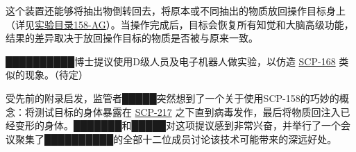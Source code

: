 这个装置还能够将抽出物倒转回去，将原本或不同抽出的物质放回操作目标身上（详见\hyperref[sec:DOC-experiment-log-158-ag]{实验目录158-AG}）。当操作完成后，目标会恢复所有知觉和大脑高级功能，结果的差异取决于放回操作目标的物质是否被与原来一致。

██████████博士提议使用D级人员及电子机器人做实验，以仿造 \hyperref[chap:SCP-168]{SCP-168} 类似的现象。（待定）

受先前的附录启发，监管者█████突然想到了一个关于使用SCP-158的巧妙的概念：将测试目标的身体暴露在 \hyperref[chap:SCP-217]{SCP-217} 之下直到病毒发作，最后将物质回注入已经变形的身体。███████和█████对这项提议感到非常兴奋，并举行了一个会议聚集了██████████的全部十二位成员讨论该技术可能带来的深远好处。

\newpage


\newpage


